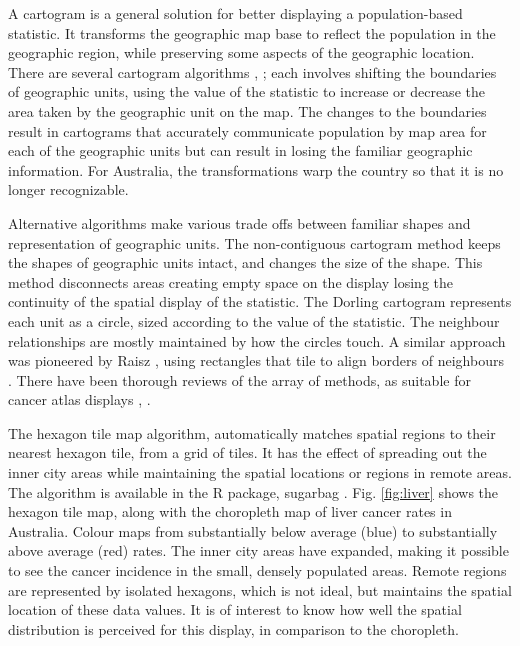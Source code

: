 \documentclass[12pt]{article}
\begin{document}
A cartogram is a general solution for better displaying a
population-based statistic. It transforms the geographic map base to
reflect the population in the geographic region, while preserving some
aspects of the geographic location. There are several cartogram
algorithms \citep{ACTUC}, \citep{CBATCC}; each involves shifting the
boundaries of geographic units, using the value of the statistic to
increase or decrease the area taken by the geographic unit on the map.
The changes to the boundaries result in cartograms that accurately
communicate population by map area for each of the geographic units but
can result in losing the familiar geographic information. For Australia,
the transformations warp the country so that it is no longer
recognizable.

Alternative algorithms make various trade offs between familiar shapes
and representation of geographic units. The non-contiguous cartogram
method \citep{NAC} keeps the shapes of geographic units intact, and
changes the size of the shape. This method disconnects areas creating
empty space on the display losing the continuity of the spatial display
of the statistic. The Dorling cartogram \citep{ACTUC} represents each
unit as a circle, sized according to the value of the statistic. The
neighbour relationships are mostly maintained by how the circles touch.
A similar approach was pioneered by Raisz \citeyearpar{RSCW}, using
rectangles that tile to align borders of neighbours \citep{CDWCS}. There
have been thorough reviews of the array of methods, as suitable for
cancer atlas displays \citep{review}, \citep{BCM}.

The hexagon tile map algorithm, automatically matches spatial regions to
their nearest hexagon tile, from a grid of tiles. It has the effect of
spreading out the inner city areas while maintaining the spatial
locations or regions in remote areas. The algorithm is available in the
R package, sugarbag \citep{sugarbag}. Fig. \ref{fig:liver} shows the
hexagon tile map, along with the choropleth map of liver cancer rates in
Australia. Colour maps from substantially below average (blue) to
substantially above average (red) rates. The inner city areas have
expanded, making it possible to see the cancer incidence in the small,
densely populated areas. Remote regions are represented by isolated
hexagons, which is not ideal, but maintains the spatial location of
these data values. It is of interest to know how well the spatial
distribution is perceived for this display, in comparison to the
choropleth.
\end{document}
